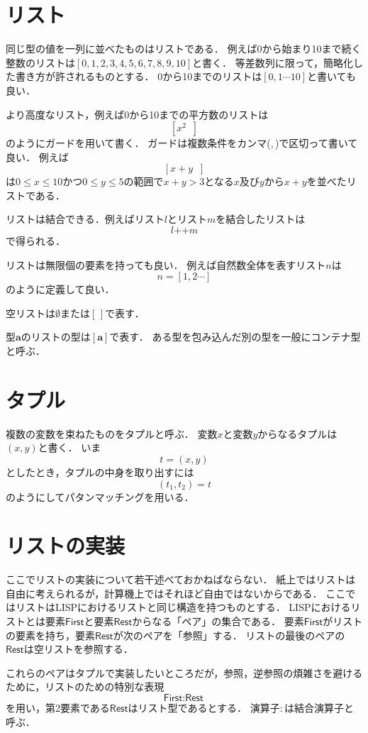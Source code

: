 \documentclass[twocolumn]{jsbook}
\newcommand{\guard}[1]{\mathop{\mid_{{#1}}}}
\newcommand{\listappend}{\mathop{++}}
\newcommand{\typename}[1]{\bm{#1}}
\newcommand{\specialkeyword}[1]{\textsf{#1}}
\newcommand{\firstelem}{\specialkeyword{First}}
\newcommand{\restelems}{\specialkeyword{Rest}}
\begin{document}
\section{リスト}

同じ型の値を一列に並べたものはリストである．
例えば0から始まり10まで続く整数のリストは$[0,1,2,3,4,5,6,7,8,9,10]$と書く．
等差数列に限って，簡略化した書き方が許されるものとする．
0から10までのリストは$[0,1\dotsb10]$と書いても良い．

より高度なリスト，例えば0から10までの平方数のリストは$$\left[x^2\guard{x\in[0,1\dotsb 10]}\right]$$のようにガードを用いて書く．
ガードは複数条件をカンマ($,$)で区切って書いて良い．
例えば$$\left[x+y\guard{x\in[0,1\dotsb 10],\,y\in[0,1\dotsb 5],\,x+y>3}\right]$$は$0\le x\le 10$かつ$0\le y\le 5$の範囲で$x+y>3$となる$x$及び$y$から$x+y$を並べたリストである．

リストは結合できる．例えばリスト$l$とリスト$m$を結合したリストは$$l\listappend m$$で得られる．

リストは無限個の要素を持っても良い．
例えば自然数全体を表すリスト$n$は$$n=[1,2\dotsb]$$のように定義して良い．

空リストは$\emptyset$または$[\,]$で表す．

型$\typename{a}$のリストの型は$[\typename{a}]$で表す．
ある型を包み込んだ別の型を一般にコンテナ型と呼ぶ．

\section{タプル}

複数の変数を束ねたものをタプルと呼ぶ．
変数$x$と変数$y$からなるタプルは$(x,y)$と書く．
いま$$t=(x,y)$$としたとき，タプルの中身を取り出すには$$(t_1,t_2)=t$$のようにしてパタンマッチングを用いる．

\section{リストの実装}

ここでリストの実装について若干述べておかねばならない．
紙上ではリストは自由に考えられるが，計算機上ではそれほど自由ではないからである．
ここではリストはLISPにおけるリストと同じ構造を持つものとする．
LISPにおけるリストとは要素$\firstelem$と要素$\restelems$からなる「ペア」の集合である．
要素$\firstelem$がリストの要素を持ち，要素$\restelems$が次のペアを「参照」する．
リストの最後のペアの$\restelems$は空リストを参照する．

これらのペアはタプルで実装したいところだが，参照，逆参照の煩雑さを避けるために，リストのための特別な表現$$\firstelem:\restelems$$を用い，第2要素である$\restelems$はリスト型であるとする．
演算子$:$は結合演算子と呼ぶ．
\end{document}
